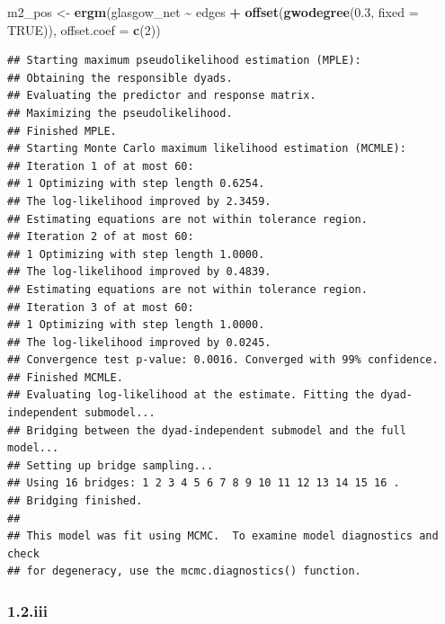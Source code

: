 \documentclass[
]{article}
\newenvironment{Shaded}{\begin{snugshade}}{\end{snugshade}}
\newcommand{\AttributeTok}[1]{\textcolor[rgb]{0.13,0.29,0.53}{#1}}
\newcommand{\ConstantTok}[1]{\textcolor[rgb]{0.56,0.35,0.01}{#1}}
\newcommand{\DecValTok}[1]{\textcolor[rgb]{0.00,0.00,0.81}{#1}}
\newcommand{\FloatTok}[1]{\textcolor[rgb]{0.00,0.00,0.81}{#1}}
\newcommand{\FunctionTok}[1]{\textcolor[rgb]{0.13,0.29,0.53}{\textbf{#1}}}
\newcommand{\NormalTok}[1]{#1}
\newcommand{\OtherTok}[1]{\textcolor[rgb]{0.56,0.35,0.01}{#1}}
\newcommand{\SpecialCharTok}[1]{\textcolor[rgb]{0.81,0.36,0.00}{\textbf{#1}}}
\begin{document}
\begin{Shaded}
\begin{Highlighting}[]
\NormalTok{m2\_pos }\OtherTok{\textless{}{-}} \FunctionTok{ergm}\NormalTok{(glasgow\_net }\SpecialCharTok{\textasciitilde{}}\NormalTok{ edges }\SpecialCharTok{+} \FunctionTok{offset}\NormalTok{(}\FunctionTok{gwodegree}\NormalTok{(}\FloatTok{0.3}\NormalTok{, }\AttributeTok{fixed =} \ConstantTok{TRUE}\NormalTok{)),}
               \AttributeTok{offset.coef =} \FunctionTok{c}\NormalTok{(}\DecValTok{2}\NormalTok{))}
\end{Highlighting}
\end{Shaded}

\begin{verbatim}
## Starting maximum pseudolikelihood estimation (MPLE):
## Obtaining the responsible dyads.
## Evaluating the predictor and response matrix.
## Maximizing the pseudolikelihood.
## Finished MPLE.
## Starting Monte Carlo maximum likelihood estimation (MCMLE):
## Iteration 1 of at most 60:
## 1 Optimizing with step length 0.6254.
## The log-likelihood improved by 2.3459.
## Estimating equations are not within tolerance region.
## Iteration 2 of at most 60:
## 1 Optimizing with step length 1.0000.
## The log-likelihood improved by 0.4839.
## Estimating equations are not within tolerance region.
## Iteration 3 of at most 60:
## 1 Optimizing with step length 1.0000.
## The log-likelihood improved by 0.0245.
## Convergence test p-value: 0.0016. Converged with 99% confidence.
## Finished MCMLE.
## Evaluating log-likelihood at the estimate. Fitting the dyad-independent submodel...
## Bridging between the dyad-independent submodel and the full model...
## Setting up bridge sampling...
## Using 16 bridges: 1 2 3 4 5 6 7 8 9 10 11 12 13 14 15 16 .
## Bridging finished.
## 
## This model was fit using MCMC.  To examine model diagnostics and check
## for degeneracy, use the mcmc.diagnostics() function.
\end{verbatim}

\subsubsection{1.2.iii}\label{iii-1}
\end{document}

